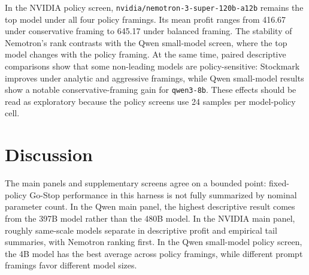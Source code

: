 \documentclass[11pt]{article}
\begin{document}
In the NVIDIA policy screen, \texttt{nvidia/nemotron-3-super-120b-a12b} remains the top model under all four policy framings. Its mean profit ranges from 416.67 under conservative framing to 645.17 under balanced framing. The stability of Nemotron's rank contrasts with the Qwen small-model screen, where the top model changes with the policy framing. At the same time, paired descriptive comparisons show that some non-leading models are policy-sensitive: Stockmark improves under analytic and aggressive framings, while Qwen small-model results show a notable conservative-framing gain for \texttt{qwen3-8b}. These effects should be read as exploratory because the policy screens use 24 samples per model-policy cell.

\begin{table}[t]
    \centering
    \caption{NVIDIA roughly same-scale policy screen. Each policy-model cell has 24 samples.}
    \label{tab:nvidia-policy}
\end{table}

\section{Discussion}
The main panels and supplementary screens agree on a bounded point: fixed-policy Go-Stop performance in this harness is not fully summarized by nominal parameter count. In the Qwen main panel, the highest descriptive result comes from the 397B model rather than the 480B model. In the NVIDIA main panel, roughly same-scale models separate in descriptive profit and empirical tail summaries, with Nemotron ranking first. In the Qwen small-model policy screen, the 4B model has the best average across policy framings, while different prompt framings favor different model sizes.
\end{document}
